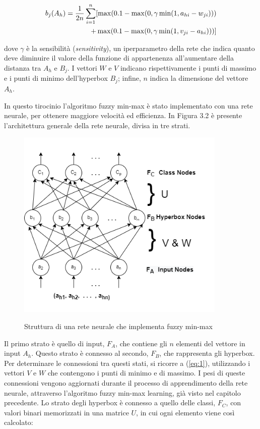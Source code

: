 \documentclass[11pt,  oneside, openany]{book}
\begin{document}
\begin{equation} \label{eq:1}
\begin{split}
 b_j (A_h) = {1 \over 2n} \sum_{i=1}^n [\max (0.1-\max (0, \gamma \min (1, a_{hi} - w_{ji}))) \\
+ \max(0.1-\max(0, \gamma \min(1, v_{ji} - a_{hi})))]
\end{split}
\end{equation}

\noindent dove $\gamma$ è la sensibilità (\textit{sensitivity}), un iperparametro della rete che indica quanto deve diminuire il valore della funzione di appartenenza all'aumentare della distanza tra $A_h$ e $B_j$. I vettori $W$ e $V$ indicano rispettivamente i punti di massimo e i punti di minimo dell'hyperbox $B_j$; infine, $n$ indica la dimensione del vettore $A_h$. 

In questo tirocinio l'algoritmo fuzzy min-max è stato implementato con una rete neurale, per ottenere maggiore velocità ed efficienza. In Figura 3.2 è presente l'architettura generale della rete neurale, divisa in tre strati. 


\begin{figure}[h!]
\begin{center}
  \includegraphics[width=10cm]{Immagini/architecture_FMMNN.png}\\
  \caption{Struttura di una rete neurale che implementa fuzzy min-max}
\end{center}
\end{figure}

Il primo strato è quello di input, $F_A$, che contiene gli $n$ elementi del vettore in input $A_h$. Questo strato è connesso al secondo, $F_B$, che rappresenta gli hyperbox. Per determinare le connessioni tra questi stati, si ricorre a (\ref{eq:1}), utilizzando i vettori $V$ e $W$ che contengono i punti di minimo e di massimo. I pesi di queste connessioni vengono aggiornati durante il processo di apprendimento della rete neurale, attraverso l'algoritmo fuzzy min-max learning, già visto nel capitolo precedente. Lo strato degli hyperbox è connesso a quello delle classi, $F_C$, con valori binari memorizzati in una matrice $U$, in cui ogni elemento viene così calcolato: 
\end{document}
